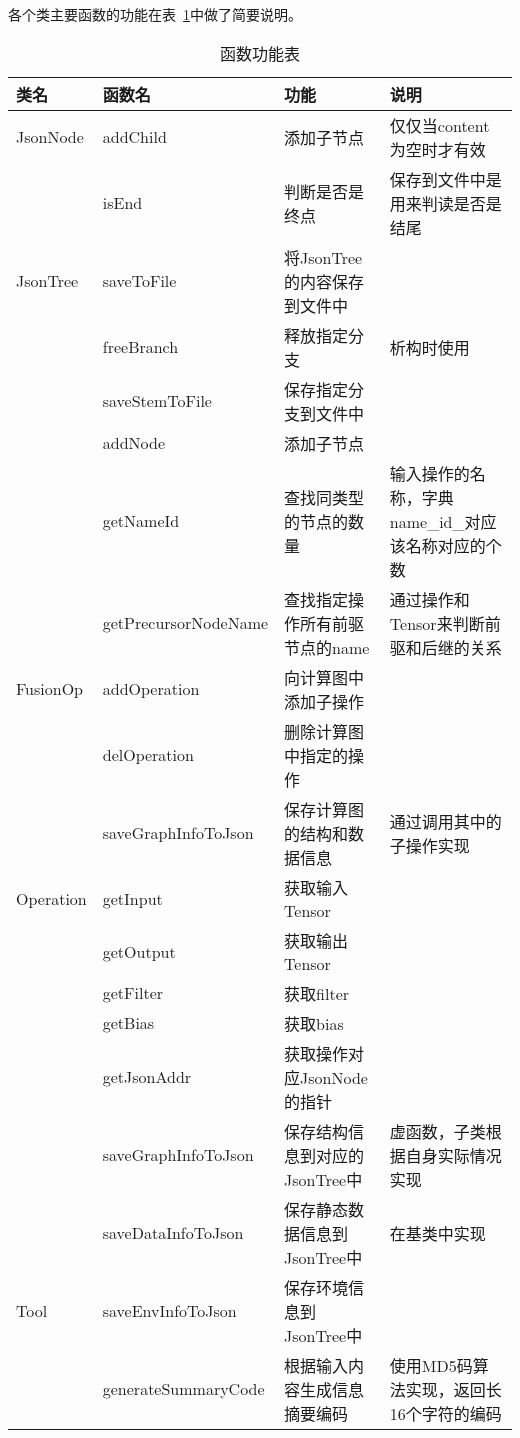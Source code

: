 各个类主要函数的功能在表~\ref{tab:function-list}中做了简要说明。
\begin{table}[htb]
  \centering\tiny
  \caption{函数功能表}
  \label{tab:function-list}
  \begin{tabular}{llll}
    \toprule
    类名        & 函数名     & 功能      & 说明                \\
    \midrule
    JsonNode   & addChild  & 添加子节点     & 仅仅当content为空时才有效 \\
               & isEnd     & 判断是否是终点 & 保存到文件中是用来判读是否是结尾\\
    \midrule
    JsonTree   & saveToFile  & 将JsonTree的内容保存到文件中  &  \\
               & freeBranch  & 释放指定分支 & 析构时使用\\
               & saveStemToFile & 保存指定分支到文件中 & \\
               & addNode & 添加子节点 & \\
               & getNameId & 查找同类型的节点的数量& 输入操作的名称，字典name\_id\_对应该名称对应的个数 \\
               & getPrecursorNodeName & 查找指定操作所有前驱节点的name & 通过操作和Tensor来判断前驱和后继的关系\\ 
    \midrule
    FusionOp   & addOperation  & 向计算图中添加子操作    &  \\
               & delOperation  & 删除计算图中指定的操作 &  \\ 
               & saveGraphInfoToJson & 保存计算图的结构和数据信息 & 通过调用其中的子操作实现 \\
    \midrule
    Operation  & getInput   & 获取输入Tensor    &  \\
               & getOutput  & 获取输出Tensor &  \\ 
               & getFilter  & 获取filter & \\
               & getBias    & 获取bias  & \\
               & getJsonAddr& 获取操作对应JsonNode的指针 & \\
               & saveGraphInfoToJson & 保存结构信息到对应的JsonTree中 & 虚函数，子类根据自身实际情况实现 \\
               & saveDataInfoToJson & 保存静态数据信息到JsonTree中 & 在基类中实现 \\
    \midrule
    Tool       & saveEnvInfoToJson   & 保存环境信息到JsonTree中  \\
               & generateSummaryCode & 根据输入内容生成信息摘要编码  &使用MD5码算法实现，返回长16个字符的编码\\

\end{tabular}
\end{table}

